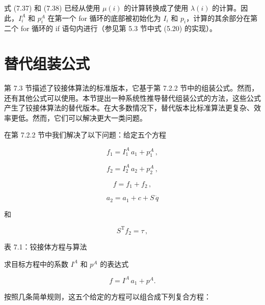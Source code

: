 \documentclass[10pt,a4paper]{book}
\theoremstyle{thmstyle} %
\theoremstyle{defstyle} %
\theoremstyle{prostyle} %
\begin{document}
式 (7.37) 和 (7.38) 已经从使用 $\mu(i)$ 的计算转换成了使用 $\lambda(i)$ 的计算。因此，$I_{i}^{A}$ 和 $p_{i}^{A}$ 在第一个 for 循环的底部被初始化为 $I_{i}$ 和 $p_{i}$，计算的其余部分在第二个 for 循环的 if 语句内进行（参见第 5.3 节中式 (5.20) 的实现）。



\section{替代组装公式}





第 7.3 节描述了铰接体算法的标准版本，它基于第 7.2.2 节中的组装公式。然而，还有其他公式可以使用。本节提出一种系统性推导替代组装公式的方法，这些公式产生了铰接体算法的替代版本。在大多数情况下，替代版本比标准算法更复杂、效率更低。然而，它们可以解决更大一类问题。



在第 7.2.2 节中我们解决了以下问题：给定五个方程



$$
f _ { 1 } = I _ { 1 } ^{A} \, a _ { 1 } + p _ { 1 } ^{A} \, ,
$$



$$
f _ { 2 } = I _ { 2 } ^{A} \, a _ { 2 } + p _ { 2 } ^{A} \, ,
$$



$$
f = f _ { 1 } + f _ { 2 } \, ,
$$



$$
a _ { 2 } = a _ { 1 } + c + S \, \ddot { q }
$$



和



$$
S ^{\mathrm { T} } f _ { 2 } = \tau \, ,
$$



表 7.1：铰接体方程与算法





求目标方程中的系数 $I^{A}$ 和 $p^{A}$ 的表达式



$$
f = I ^{A} \, a _ { 1 } + p ^{A} .
$$



按照几条简单规则，这五个给定的方程可以组合成下列复合方程：
\end{document}
